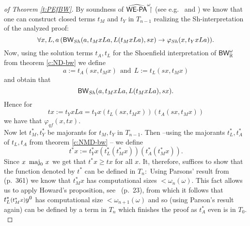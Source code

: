 \begin{proof}[ of Theorem \ref{t:PEfBW}]
By soundness of $\widehat{\textsf{\upshape WE-PA}}^\omega\!\!\!\restriction$ (see e.g.~\cite{Kohlenbach08} and 
\cite{streicherkohlenbach07}) we know that one can construct 
closed terms $t_M$ and $t_Y$ in $T_{n-1}$ realizing the Sh-interpretation 
of the analyzed proof:
\[
\forall x,L,a\, (\textsf{\upshape BW}_{Sh}(a,t_MxLa,L(t_MxLa),sx)\rightarrow\varphi_{Sh}(x,t_YxLa))
\text{.}
\]
Now, using the solution terms $t_A,t_L$ for the Shoenfield interpretation of 
$\textsf{\upshape BW}^{\omega}_{\mathbb{R}}$ from theorem \ref{c:ND-bw} we define 
\[ a:=t_A(sx,t_Mx) \ \ \mbox{and} \ \ L:=t_L(sx,t_Mx) \] 
and obtain that 
\[ \textsf{\upshape BW}_{Sh}(a,t_MxLa,L(t_MxLa),sx). \] 
Hence for 
\[ tx:=t_YxLa=t_Yx(t_L(sx,t_Mx))(t_A(sx,t_Mx)) \] 
we have that $\varphi_{qf}(x,tx).$
\\ Now let $t^*_M,t^*_Y$ be majorants for $t_M,t_Y$ in $T_{n-1}.$ 
Then --using the majorants $t^*_L,t^*_A$ of $t_L,t_A$ from theorem 
\ref{c:NMD-bw} -- we define 
\[ t^*x:=t^*_Yx(t^*_L(t^*_Mx))(t^*_A(t^*_Mx)). \] 
Since $x \ \operatorname{maj}_0 \, x$ we get that $t^*x\ge tx$ for all $x.$ It, therefore, 
suffices to show 
that the function denoted by $t^*$ can be defined in $T_n:$
Using Parsons' result
from \cite{Parsons71} (p.~361) we know that
$t^*_Mx$ has computational sizes $<\omega_{n}(\omega)$.
This fact allows us to apply Howard's proposition, see~\cite{Howard81} (p.~23),
from which it follows that $t^*_L\args{(t^*_Mx)}y^0$ has 
computational size $<\omega_{n+1}(\omega)$ and so (using Parson's result 
again) can be defined by a term in $T_n$ which finishes the proof as 
$t^*_A$ even is in $T_0.$\\
\end{proof}


